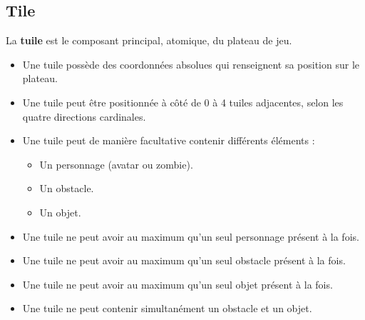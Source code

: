 \subsection{Tile}
La \textbf{tuile} est le composant principal, atomique, du plateau de jeu.
\begin{itemize}
    \item Une tuile possède des coordonnées absolues qui renseignent sa position sur le plateau.
    \item Une tuile peut être positionnée à côté de 0 à 4 tuiles adjacentes, selon les quatre directions cardinales.
    \item Une tuile peut de manière facultative contenir différents éléments :
        \begin{itemize}
            \item Un personnage (avatar ou zombie).
            \item Un obstacle.
            \item Un objet.
        \end{itemize}
      \item Une tuile ne peut avoir au maximum qu'un seul personnage présent à la fois.
      \item Une tuile ne peut avoir au maximum qu'un seul obstacle présent à la fois.
      \item Une tuile ne peut avoir au maximum qu'un seul objet présent à la fois.
      \item Une tuile ne peut contenir simultanément un obstacle et un objet.
    \end{itemize}

